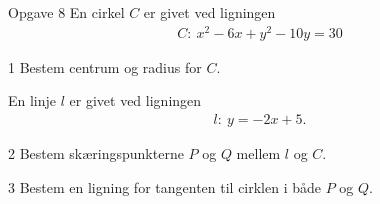 \newpage
\begin{opgavetekst}{Opgave 8}
	En cirkel $C$ er givet ved ligningen 
	\begin{align*}
		C: \ x^2-6x+y^2-10y=30
	\end{align*}
\end{opgavetekst}
\begin{delopgave}{}{1}
	Bestem centrum og radius for $C$.
\end{delopgave}
\begin{meretekst}
	En linje $l$ er givet ved ligningen 
	\begin{align*}
		l: \ y = -2x+5.
	\end{align*}
\end{meretekst}
\begin{delopgave}{}{2}
	Bestem skæringspunkterne $P$ og $Q$ mellem $l$ og $C$. 
\end{delopgave}
\begin{delopgave}{}{3}
	Bestem en ligning for tangenten til cirklen i både $P$ og $Q$.
\end{delopgave}
